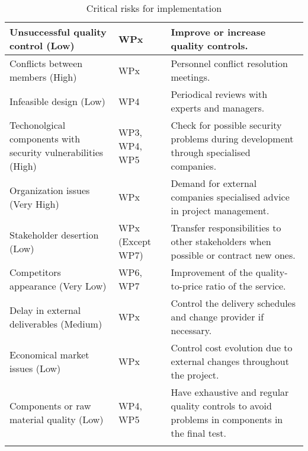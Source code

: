 \begin{longtable}[H]{p{4cm} p{4.7cm} p{5cm}}
 	\midrule

	Unsuccessful quality control (Low) & WPx & Improve or increase quality controls. \vspace{0.2cm} \\
 	
 	\midrule

	Conflicts between members  (High) & WPx & Personnel conflict resolution meetings. \vspace{0.2cm} \\
 	
 	\midrule

 	Infeasible design (Low) & WP4 & Periodical reviews with experts and managers. \vspace{0.2cm} \\
 	
 	\midrule

	Techonolgical components with security vulnerabilities (High) & WP3, WP4, WP5 & Check for possible security problems during development through specialised companies. \vspace{0.2cm} \\
 	
 	\midrule

	Organization issues (Very High) & WPx & Demand for external companies specialised advice in project management. \vspace{0.2cm} \\
 	
 	\midrule

	Stakeholder desertion (Low) & WPx (Except WP7) & Transfer responsibilities to other stakeholders when possible or contract new ones. \vspace{0.2cm} \\
 	
 	\midrule

	Competitors appearance (Very Low) & WP6, WP7 & Improvement of the quality-to-price ratio of the service. \vspace{0.2cm} \\
 	
 	\midrule

	Delay in external deliverables (Medium) & WPx & Control the delivery schedules and change provider if necessary. \vspace{0.2cm} \\
 	
 	\midrule

	Economical market issues (Low) & WPx & Control cost evolution due to external changes throughout the project. \vspace{0.2cm} \\
 	
 	\midrule

	Components or raw material quality (Low) & WP4, WP5 & Have exhaustive and regular quality controls to avoid problems in components in the final test. \vspace{0.2cm} \\
	
	\bottomrule[2pt]
	
	\caption{Critical risks for implementation}
	\label{workpackages}
\end{longtable}

